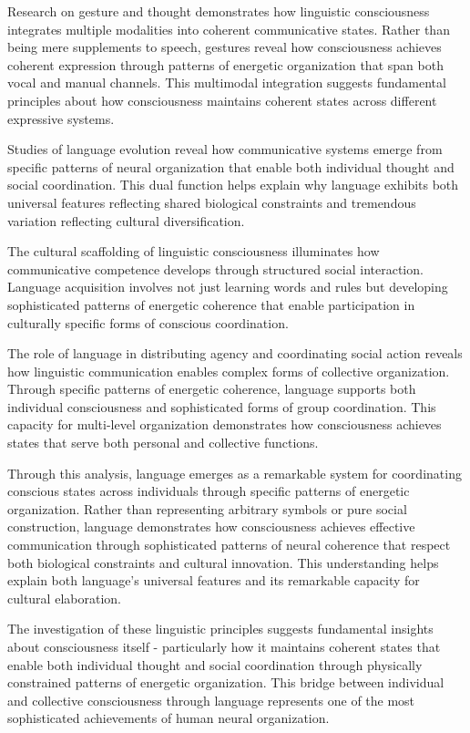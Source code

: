 \begin{refsection}
Research on gesture and thought \cite{McNeill2005} demonstrates how linguistic consciousness integrates multiple modalities into coherent communicative states. Rather than being mere supplements to speech, gestures reveal how consciousness achieves coherent expression through patterns of energetic organization that span both vocal and manual channels. This multimodal integration suggests fundamental principles about how consciousness maintains coherent states across different expressive systems.

Studies of language evolution \cite{Hauser2002} reveal how communicative systems emerge from specific patterns of neural organization that enable both individual thought and social coordination. This dual function helps explain why language exhibits both universal features reflecting shared biological constraints and tremendous variation reflecting cultural diversification.

The cultural scaffolding of linguistic consciousness \cite{Vygotsky2012} illuminates how communicative competence develops through structured social interaction. Language acquisition involves not just learning words and rules but developing sophisticated patterns of energetic coherence that enable participation in culturally specific forms of conscious coordination.

The role of language in distributing agency and coordinating social action \cite{Arbib2012} reveals how linguistic communication enables complex forms of collective organization. Through specific patterns of energetic coherence, language supports both individual consciousness and sophisticated forms of group coordination. This capacity for multi-level organization demonstrates how consciousness achieves states that serve both personal and collective functions.

Through this analysis, language emerges as a remarkable system for coordinating conscious states across individuals through specific patterns of energetic organization. Rather than representing arbitrary symbols or pure social construction, language demonstrates how consciousness achieves effective communication through sophisticated patterns of neural coherence that respect both biological constraints and cultural innovation. This understanding helps explain both language's universal features and its remarkable capacity for cultural elaboration.

The investigation of these linguistic principles suggests fundamental insights about consciousness itself - particularly how it maintains coherent states that enable both individual thought and social coordination through physically constrained patterns of energetic organization. This bridge between individual and collective consciousness through language represents one of the most sophisticated achievements of human neural organization.


\end{refsection}
